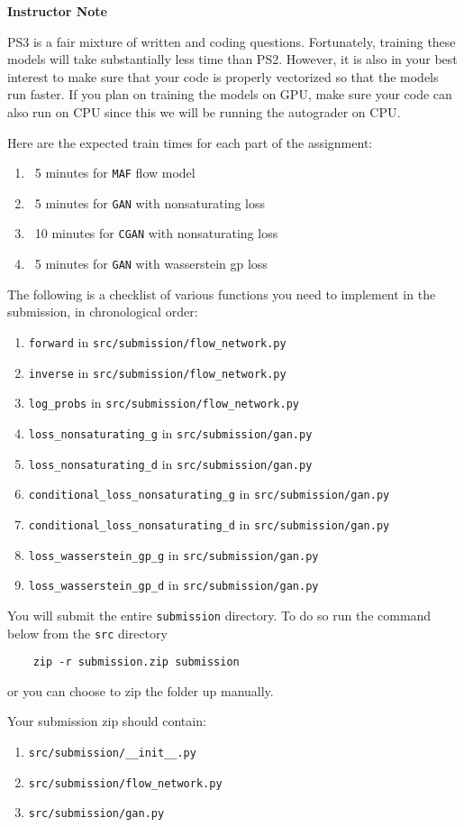 \textbf{Instructor Note}

PS3 is a fair mixture of written and coding questions. Fortunately, training these models
will take substantially less time than PS2. However, it is also in your best interest to make sure that your code 
is properly vectorized so that the models run faster. If you plan on training the models on GPU, make sure your 
code can also run on CPU since this we will be running the autograder on CPU.

Here are the expected train times for each part of the assignment:
\begin{enumerate}
    \item ~5 minutes for \texttt{MAF} flow model
    \item ~5 minutes for \texttt{GAN} with nonsaturating loss
    \item ~10 minutes for \texttt{CGAN} with nonsaturating loss
    \item ~5 minutes for \texttt{GAN} with wasserstein gp loss
\end{enumerate}

The following is a checklist of various functions you need to implement in the
submission, in chronological order:

\begin{enumerate}
    \item \texttt{forward} in \texttt{src/submission/flow\_network.py}
    \item \texttt{inverse} in \texttt{src/submission/flow\_network.py}
    \item \texttt{log\_probs} in \texttt{src/submission/flow\_network.py}
    \item \texttt{loss\_nonsaturating\_g} in \texttt{src/submission/gan.py}
    \item \texttt{loss\_nonsaturating\_d} in \texttt{src/submission/gan.py}
    \item \texttt{conditional\_loss\_nonsaturating\_g} in \texttt{src/submission/gan.py}
    \item \texttt{conditional\_loss\_nonsaturating\_d} in \texttt{src/submission/gan.py}
    \item \texttt{loss\_wasserstein\_gp\_g} in \texttt{src/submission/gan.py}
    \item \texttt{loss\_wasserstein\_gp\_d} in \texttt{src/submission/gan.py}
\end{enumerate}

You will submit the entire \texttt{submission} directory. To do so run the command  below from the \texttt{src} directory
\begin{verbatim}
    zip -r submission.zip submission
\end{verbatim}

or you can choose to zip the folder up manually.

Your submission zip should contain:
\begin{enumerate}
    \item \texttt{src/submission/\_\_init\_\_.py}
    \item \texttt{src/submission/flow\_network.py}
    \item \texttt{src/submission/gan.py}
\end{enumerate}